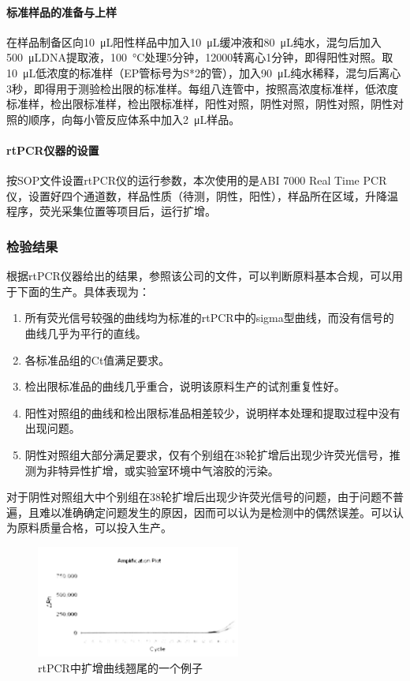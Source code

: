 \documentclass[cn,black,12pt,normal]{elegantnote}
\begin{document}
\paragraph{标准样品的准备与上样} 在样品制备区向\SI{10}{\micro\liter}阳性样品中加入\SI{10}{\micro\liter}缓冲液和\SI{80}{\micro\liter}纯水，混匀后加入\SI{500}{\micro\liter}DNA提取液，\SI{100}{\celsius}处理5分钟，12000转离心1分钟，即得阳性对照。取\SI{10}{\micro\liter}低浓度的标准样（EP管标号为S*2的管），加入\SI{90}{\micro\liter}纯水稀释，混匀后离心3秒，即得用于测验检出限的标准样。每组八连管中，按照高浓度标准样，低浓度标准样，检出限标准样，检出限标准样，阳性对照，阴性对照，阴性对照，阴性对照的顺序，向每小管反应体系中加入\SI{2}{\micro\liter}样品。

\paragraph{rtPCR仪器的设置} 按SOP文件设置rtPCR仪的运行参数，本次使用的是ABI 7000 Real Time PCR仪，设置好四个通道数，样品性质（待测，阴性，阳性），样品所在区域，升降温程序，荧光采集位置等项目后，运行扩增。

\subsubsection{检验结果}

根据rtPCR仪器给出的结果，参照该公司的文件，可以判断原料基本合规，可以用于下面的生产。具体表现为：

\begin{enumerate}
    \item 所有荧光信号较强的曲线均为标准的rtPCR中的sigma型曲线，而没有信号的曲线几乎为平行的直线。
    \item 各标准品组的Ct值满足要求。
    \item 检出限标准品的曲线几乎重合，说明该原料生产的试剂重复性好。
    \item 阳性对照组的曲线和检出限标准品相差较少，说明样本处理和提取过程中没有出现问题。
    \item 阴性对照组大部分满足要求，仅有个别组在38轮扩增后出现少许荧光信号，推测为非特异性扩增，或实验室环境中气溶胶的污染。
\end{enumerate}
对于阴性对照组大中个别组在38轮扩增后出现少许荧光信号的问题，由于问题不普遍，且难以准确确定问题发生的原因，因而可以认为是检测中的偶然误差。可以认为原料质量合格，可以投入生产。

\begin{figure}[H]
    \centering
    \includegraphics[width=0.6\textwidth]{image/WechatIMG23.jpeg}
    \caption{rtPCR中扩增曲线翘尾的一个例子}
    \label{rtres}
\end{figure}
\end{document}
